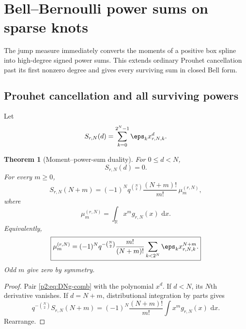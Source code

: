 \documentclass[11pt,oneside]{article}
\newtheorem{theorem}{Theorem}[section]
\theoremstyle{definition}
\newcommand{\dd}{\,\mathrm d}
\newcommand{\R}{\mathbb R}
\begin{document}
\section{Bell--Bernoulli power sums on sparse knots}
\label{p2:sec:power-sums}

The jump measure immediately converts the moments of a positive box spline
into high-degree signed power sums.  This extends ordinary Prouhet cancellation
past its first nonzero degree and gives every surviving sum in closed Bell form.

\subsection{Prouhet cancellation and all surviving powers}

Let
\begin{equation}
 S_{r,N}(d)=\sum_{k=0}^{2^N-1}\eps_k x_{r,N,k}^{d}.         \label{p2:eq:S-rNd}
\end{equation}

\begin{theorem}[Moment--power-sum duality]
\label{p2:thm:moment-power-duality}
For $0\le d<N$,
\begin{equation}
 S_{r,N}(d)=0.                                             \label{p2:eq:Prouhet-sparse}
\end{equation}
For every $m\ge0$,
\begin{equation}
 \boxed{\displaystyle
 S_{r,N}(N+m)=(-1)^Nq^{\binom N2}
   \frac{(N+m)!}{m!}\,\mu_m^{(r,N)},}                     \label{p2:eq:power-sum-moment}
\end{equation}
where
\begin{equation}
 \mu_m^{(r,N)}=\int_{\R}x^m g_{r,N}(x)\,\dd x.            \label{p2:eq:finite-moment}
\end{equation}
Equivalently,
\begin{equation}
 \boxed{\displaystyle
 \mu_m^{(r,N)}=(-1)^Nq^{-\binom N2}\frac{m!}{(N+m)!}
   \sum_{k<2^N}\eps_kx_{r,N,k}^{N+m}.}                   \label{p2:eq:moment-from-TM}
\end{equation}
Odd $m$ give zero by symmetry.
\end{theorem}

\begin{proof}
Pair \eqref{p2:eq:DNg-comb} with the polynomial $x^d$.  If $d<N$, its $N$th
derivative vanishes.  If $d=N+m$, distributional integration by parts gives
\[
 q^{-\binom N2}S_{r,N}(N+m)
 =(-1)^N\frac{(N+m)!}{m!}\int x^m g_{r,N}(x)\,\dd x.
\]
Rearrange.
\end{proof}
\end{document}
